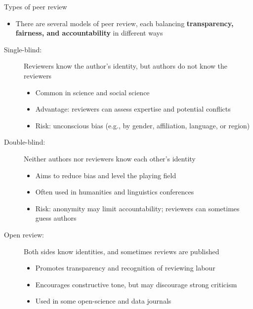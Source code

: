 \documentclass[aspectratio=169]{beamer}
\begin{document}
\begin{frame}{Types of peer review}
\begin{itemize}
  \item There are several models of peer review, each balancing \textbf{transparency, fairness, and accountability} in different ways
\end{itemize}

\begin{description}
  \item[Single-blind:] Reviewers know the author's identity, but authors do not know the reviewers
    \begin{itemize}
      \item Common in science and social science
      \item Advantage: reviewers can assess expertise and potential conflicts
      \item Risk: unconscious bias (e.g., by gender, affiliation, language, or region)
    \end{itemize}

  \item[Double-blind:] Neither authors nor reviewers know each other's identity
    \begin{itemize}
      \item Aims to reduce bias and level the playing field
      \item Often used in humanities and linguistics conferences
      \item Risk: anonymity may limit accountability; reviewers can sometimes guess authors
    \end{itemize}

  \item[Open review:] Both sides know identities, and sometimes reviews are published
    \begin{itemize}
      \item Promotes transparency and recognition of reviewing labour
      \item Encourages constructive tone, but may discourage strong criticism
      \item Used in some open-science and data journals
    \end{itemize}
\end{description}

 \end{frame}
\end{document}
